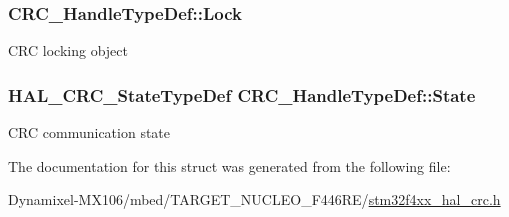 \subsubsection[{\texorpdfstring{Lock}{Lock}}]{ C\+R\+C\+\_\+\+Handle\+Type\+Def\+::\+Lock}\hypertarget{struct_c_r_c___handle_type_def_a8424c2419e573117042e58d10ebe2e8f}{}\label{struct_c_r_c___handle_type_def_a8424c2419e573117042e58d10ebe2e8f}
C\+RC locking object 
\subsubsection[{\texorpdfstring{State}{State}}]{ {\bf H\+A\+L\+\_\+\+C\+R\+C\+\_\+\+State\+Type\+Def} C\+R\+C\+\_\+\+Handle\+Type\+Def\+::\+State}\hypertarget{struct_c_r_c___handle_type_def_a401f5c24d8e1fbe904234802d53c4f43}{}\label{struct_c_r_c___handle_type_def_a401f5c24d8e1fbe904234802d53c4f43}
C\+RC communication state 

The documentation for this struct was generated from the following file\+:\begin{DoxyCompactItemize}
\item 
Dynamixel-\/\+M\+X106/mbed/\+T\+A\+R\+G\+E\+T\+\_\+\+N\+U\+C\+L\+E\+O\+\_\+\+F446\+R\+E/\hyperlink{stm32f4xx__hal__crc_8h}{stm32f4xx\+\_\+hal\+\_\+crc.\+h}\end{DoxyCompactItemize}
